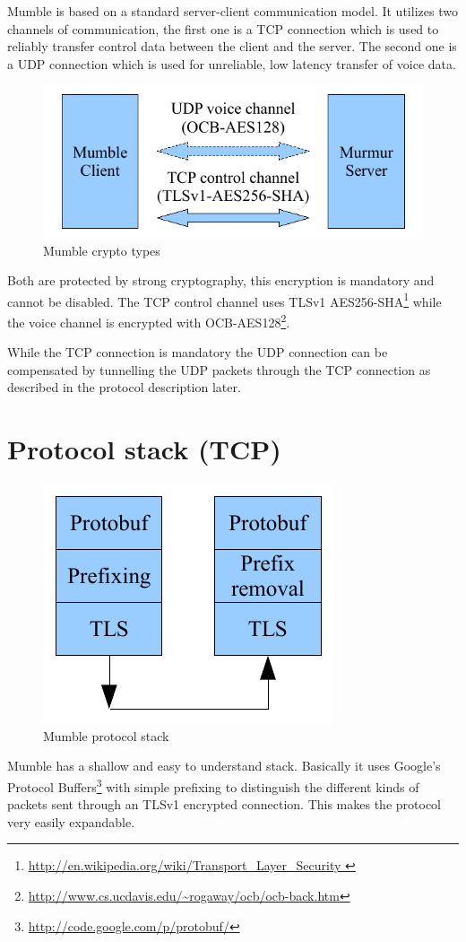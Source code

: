 \documentclass[11pt]{article} %
\begin{document}
Mumble is based on a standard server-client communication model. It utilizes two channels of communication, the first one is a TCP connection which is used to reliably transfer control data between the client and the server. The second one is a UDP connection which is used for unreliable, low latency transfer of voice data.

\begin{figure}[ht]
	\centering
	\includegraphics[width=0.5\linewidth]{resources/mumble_crypt_types}
	\caption{Mumble crypto types}
	\label{fig:mumble_crypt_types}
\end{figure}

Both are protected by strong cryptography, this encryption is mandatory and cannot be disabled. The TCP control channel uses TLSv1 AES256-SHA\footnote{\url{http://en.wikipedia.org/wiki/Transport_Layer_Security }} while the voice channel is encrypted with OCB-AES128\footnote{\url{http://www.cs.ucdavis.edu/~rogaway/ocb/ocb-back.htm}}.

While the TCP connection is mandatory the UDP connection can be compensated by tunnelling the UDP packets through the TCP connection as described in the protocol description later.

\section{Protocol stack (TCP)}

\begin{figure}[ht]
	\centering
	\includegraphics[width=0.3\linewidth]{resources/mumble_protocol_stack}
	\caption{Mumble protocol stack}
	\label{fig:mumble_protocol_stack}
\end{figure}

Mumble has a shallow and easy to understand stack. Basically it uses Google's Protocol Buffers\footnote{\url{http://code.google.com/p/protobuf/}} with simple prefixing to distinguish the different kinds of packets sent through an TLSv1 encrypted connection. This makes the protocol very easily expandable.
\end{document}
